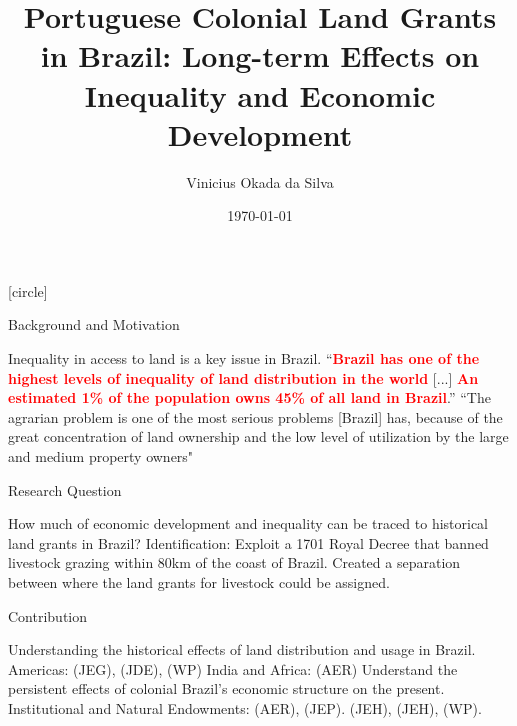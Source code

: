 \documentclass[aspectratio=1610]{beamer}
\title{Portuguese Colonial Land Grants in Brazil: Long-term Effects on Inequality and Economic Development}
\author{Vinicius Okada da Silva}
\date{\today}
\begin{document}
[circle]

\begin{frame}
	\titlepage
\end{frame}

\begin{frame}{Background and Motivation}
    \begin{outline}
        \1 Inequality in access to land is a key issue in Brazil.
            \vspace{2mm}
            \2 ``\textcolor{red}{\textbf{Brazil has one of the highest levels of inequality of land distribution in the world}} [...] \textcolor{red}{\textbf{An estimated 1\% of the population owns 45\% of all land in Brazil}}.'' \parencite{Usaid2016-xs}
        \vspace{2mm}
        \pause 
        \1 ``The agrarian problem is one of the most serious problems [Brazil] has, because of the great concentration of land ownership and the low level of utilization by the large and medium property owners" \parencite[p.~1]{De_Oliveira_Andrade1980-xz}
    \end{outline}
\end{frame}

\begin{frame}{Research Question}
    \begin{outline}
        \1 How much of economic development and inequality can be traced to historical land grants in Brazil?
        \vspace{2mm}
        \pause 
        \1 Identification:
        \vspace{2mm}
            \2 Exploit a 1701 Royal Decree that banned livestock grazing within 80km of the coast of Brazil.
        \vspace{2mm}
            \2 Created a separation between where the land grants for livestock could be assigned.
    \end{outline}
\end{frame}

\begin{frame}{Contribution}
    \begin{outline}
        \1 Understanding the historical effects of land distribution and usage in Brazil.
        \vspace{2mm}
            \2 Americas: 
            \cite{Wigton-Jones2020-ex} (JEG),
            \cite{Sellars2018-yp} (JDE),
            \cite{Smith2023-ip} (WP)
            \vspace{2mm}
            \2 India and Africa: 
            \cites{Banerjee2005-ki} (AER)
        \vspace{2mm}
        \1 Understand the persistent effects of colonial Brazil's economic structure on the present.
        \vspace{2mm}
        \2 Institutional and Natural Endowments: 
        \cite{Acemoglu2001-dz} (AER), 
        \cite{Sokoloff2000-mb} (JEP).
        \vspace{2mm}
        \2 
        \cite{Naritomi2012-or} (JEH), 
        \cite{Musacchio2014-pq} (JEH),
        \cite{Laudares2022-vy} (WP). 
    \end{outline}
\end{frame}
\end{document}
